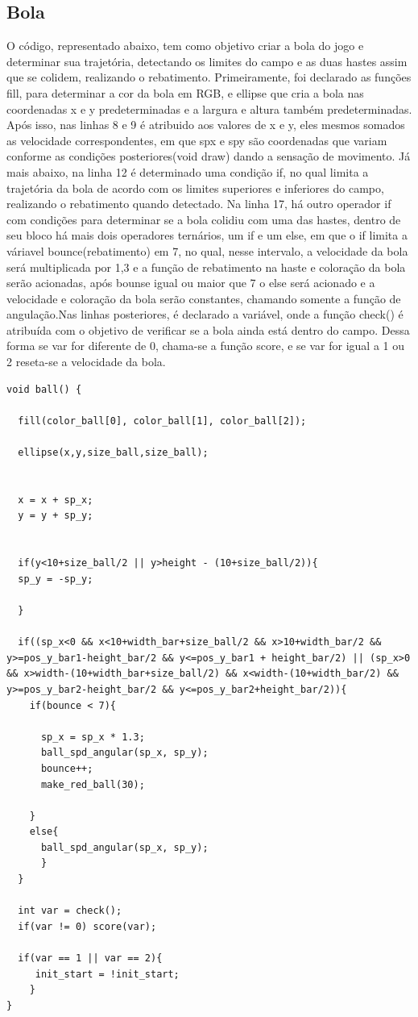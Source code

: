 \documentclass[conference]{IEEEtran}
\begin{document}
\subsection{Bola}\label{AA}
O código, representado abaixo, tem como objetivo criar a bola do jogo
e determinar sua trajetória, detectando os limites do campo e as duas 
hastes assim que se colidem, realizando o rebatimento. Primeiramente, 
foi declarado as funções fill, para determinar a cor da bola em RGB, 
e ellipse que cria a bola nas coordenadas x e y predeterminadas e a 
largura e altura também predeterminadas. Após isso, nas linhas 8 e 
9 é atribuido aos valores de x e y, eles mesmos somados as velocidade 
correspondentes, em que spx e spy são coordenadas que variam conforme
as condições posteriores(void draw) dando a sensação de movimento. Já mais abaixo, na linha 12 é determinado uma condição if, no qual limita a trajetória 
da bola de acordo com os limites superiores e inferiores do campo, 
realizando o rebatimento quando detectado. Na linha 17, há outro operador
if com condições para determinar se a bola colidiu com uma das hastes, dentro 
de seu bloco há mais dois operadores ternários, um if e um else, em que o if 
limita a váriavel bounce(rebatimento) em 7, no qual, nesse intervalo, a velocidade da bola será multiplicada por 1,3 e a função de rebatimento na haste e coloração da bola serão acionadas, após bounse igual ou maior que 7 o else será acionado e a velocidade e coloração da bola serão constantes, chamando somente a função de angulação.Nas linhas posteriores, é declarado a variável, onde a função check() é atribuída com o objetivo de verificar se a bola ainda está dentro do campo. Dessa forma se var for diferente de 0, chama-se a função score, e se var for igual a 1 ou 2 reseta-se a velocidade da bola. 
    \begin{lstlisting}
void ball() {
  
  fill(color_ball[0], color_ball[1], color_ball[2]);
  
  ellipse(x,y,size_ball,size_ball);
  
 
  x = x + sp_x;
  y = y + sp_y;

  
  if(y<10+size_ball/2 || y>height - (10+size_ball/2)){ 
  sp_y = -sp_y; 
      
  }
  
  if((sp_x<0 && x<10+width_bar+size_ball/2 && x>10+width_bar/2 && y>=pos_y_bar1-height_bar/2 && y<=pos_y_bar1 + height_bar/2) || (sp_x>0 && x>width-(10+width_bar+size_ball/2) && x<width-(10+width_bar/2) && y>=pos_y_bar2-height_bar/2 && y<=pos_y_bar2+height_bar/2)){
    if(bounce < 7){                                                    
      
      sp_x = sp_x * 1.3; 
      ball_spd_angular(sp_x, sp_y);
      bounce++;
      make_red_ball(30);
      
    }
    else{
      ball_spd_angular(sp_x, sp_y);
      }
  }
 
  int var = check();
  if(var != 0) score(var);
  
  if(var == 1 || var == 2){
     init_start = !init_start;
    }
}

    \end{lstlisting}
\end{document}
